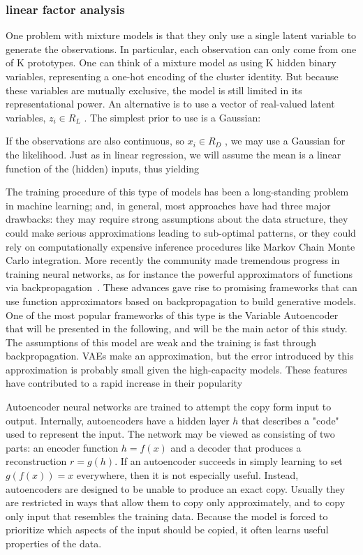 \subsubsection{linear factor analysis}
\label{linear factor analysis}
One problem with mixture models is that they only use a single latent variable to generate the
observations. In particular, each observation can only come from one of K prototypes. One can
think of a mixture model as using K hidden binary variables, representing a one-hot encoding
of the cluster identity. But because these variables are mutually exclusive, the model is still
limited in its representational power.
An alternative is to use a vector of real-valued latent variables, $z_i \in R_L$ . The simplest prior
to use is a Gaussian:


If the observations are also continuous, so $x_i \in R_D$ , we may use a Gaussian for the likelihood.
Just as in linear regression, we will assume the mean is a linear function of the (hidden) inputs,
thus yielding



The training procedure of this type of models has been a long-standing problem in machine learning; and, in general, most approaches have had three major drawbacks: they may require strong assumptions about the data structure, they could make serious approximations leading to sub-optimal patterns, or they could rely on computationally expensive inference procedures like Markov Chain Monte Carlo integration. More recently the community made tremendous progress in training neural networks, as for instance the powerful approximators of functions via backpropagation~\cite{NIPS2012_4824}. These advances gave rise to promising frameworks that can use function approximators based on backpropagation to build generative models. One of the most popular frameworks of this type is the Variable Autoencoder \cite{} that will be presented in the following, and will be the main actor of this study. The assumptions of this model are weak and the training is fast through backpropagation. VAEs make an approximation, but the error introduced by this approximation is probably small given the high-capacity models. These features have contributed to a rapid increase in their popularity



Autoencoder neural networks are trained to attempt the copy form input to output. Internally, autoencoders have a hidden layer $h$ that describes a "code" used to represent the input. The network may be viewed as consisting of two parts: an encoder function $h=f(x)$ and a decoder that produces a reconstruction $r=g(h)$. If an autoencoder succeeds in simply learning to set $g(f(x))=x$ everywhere, then it is not especially useful. Instead, autoencoders are designed to be unable to produce an exact copy. Usually they are restricted in ways that allow them to copy only approximately, and to copy only input that resembles the training data. Because the model is forced to prioritize which aspects of the input should be copied, it often learns useful properties of the data.


